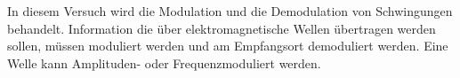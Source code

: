 In diesem Versuch wird die Modulation und die Demodulation von Schwingungen behandelt.
Information die über elektromagnetische Wellen übertragen werden sollen, müssen moduliert werden und am Empfangsort demoduliert werden.
Eine Welle kann Amplituden- oder Frequenzmoduliert werden.